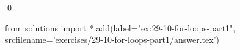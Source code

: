 
\begin{ex}
  \label{ex:29-10-for-loops-part1}
  
  \qed
\end{ex}
\begin{python0}
from solutions import *
add(label="ex:29-10-for-loops-part1",
    srcfilename='exercises/29-10-for-loops-part1/answer.tex')
\end{python0}
